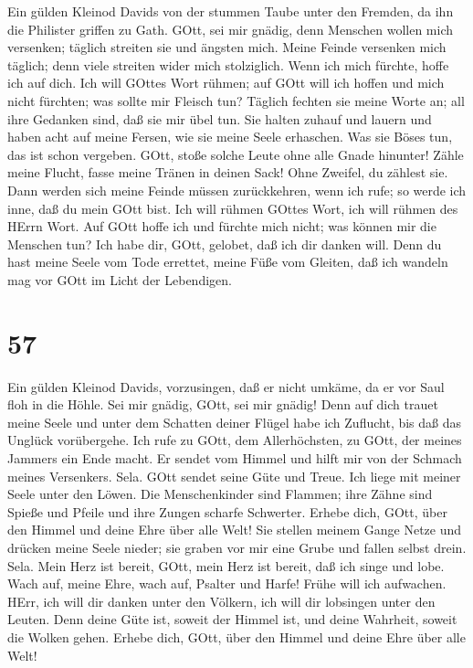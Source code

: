  Ein gülden Kleinod Davids von der stummen Taube unter den
Fremden, da ihn die Philister griffen zu Gath.  GOtt, sei
mir gnädig, denn Menschen wollen mich versenken; täglich streiten sie
und ängsten mich.  Meine Feinde versenken mich täglich; denn
viele streiten wider mich stolziglich.  Wenn ich mich
fürchte, hoffe ich auf dich.  Ich will GOttes Wort rühmen;
auf GOtt will ich hoffen und mich nicht fürchten; was sollte mir Fleisch
tun?  Täglich fechten sie meine Worte an; all ihre Gedanken
sind, daß sie mir übel tun.  Sie halten zuhauf und lauern
und haben acht auf meine Fersen, wie sie meine Seele erhaschen.
 Was sie Böses tun, das ist schon vergeben. GOtt, stoße
solche Leute ohne alle Gnade hinunter!  Zähle meine Flucht,
fasse meine Tränen in deinen Sack! Ohne Zweifel, du zählest sie.
 Dann werden sich meine Feinde müssen zurückkehren, wenn
ich rufe; so werde ich inne, daß du mein GOtt bist.  Ich
will rühmen GOttes Wort, ich will rühmen des HErrn Wort. 
Auf GOtt hoffe ich und fürchte mich nicht; was können mir die Menschen
tun?  Ich habe dir, GOtt, gelobet, daß ich dir danken will.
 Denn du hast meine Seele vom Tode errettet, meine Füße vom
Gleiten, daß ich wandeln mag vor GOtt im Licht der Lebendigen.

\hypertarget{section-56}{%
\section{57}\label{section-56}}

 Ein gülden Kleinod Davids, vorzusingen, daß er nicht
umkäme, da er vor Saul floh in die Höhle.  Sei mir gnädig,
GOtt, sei mir gnädig! Denn auf dich trauet meine Seele und unter dem
Schatten deiner Flügel habe ich Zuflucht, bis daß das Unglück
vorübergehe.  Ich rufe zu GOtt, dem Allerhöchsten, zu GOtt,
der meines Jammers ein Ende macht.  Er sendet vom Himmel und
hilft mir von der Schmach meines Versenkers. Sela. GOtt sendet seine
Güte und Treue.  Ich liege mit meiner Seele unter den Löwen.
Die Menschenkinder sind Flammen; ihre Zähne sind Spieße und Pfeile und
ihre Zungen scharfe Schwerter.  Erhebe dich, GOtt, über den
Himmel und deine Ehre über alle Welt!  Sie stellen meinem
Gange Netze und drücken meine Seele nieder; sie graben vor mir eine
Grube und fallen selbst drein. Sela.  Mein Herz ist bereit,
GOtt, mein Herz ist bereit, daß ich singe und lobe.  Wach
auf, meine Ehre, wach auf, Psalter und Harfe! Frühe will ich aufwachen.
 HErr, ich will dir danken unter den Völkern, ich will dir
lobsingen unter den Leuten.  Denn deine Güte ist, soweit
der Himmel ist, und deine Wahrheit, soweit die Wolken gehen.
 Erhebe dich, GOtt, über den Himmel und deine Ehre über
alle Welt!


